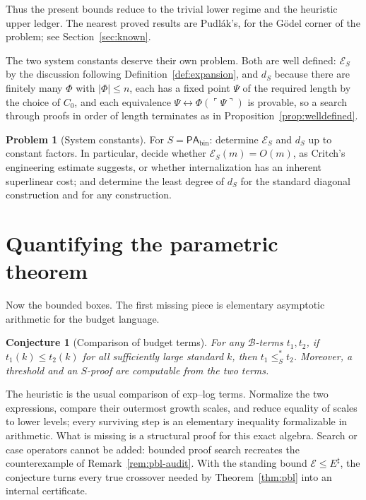 \documentclass[11pt]{amsart}
\theoremstyle{plain}
\newtheorem{conjecture}[theorem]{Conjecture}
\theoremstyle{definition}
\newtheorem{problem}[theorem]{Problem}
\newcommand{\PAbin}{\mathsf{PA}_{\mathrm{bin}}}
\newcommand{\gn}[1]{\ulcorner #1 \urcorner}
\newcommand{\Bud}{\mathcal{B}}
\newcommand{\leSstar}{\mathrel{\leq_S^{*}}}
\begin{document}
Thus the present bounds reduce to the trivial lower regime and the heuristic upper ledger. The nearest proved results are Pudl\'ak's, for the G\"odel corner of the problem; see Section~\ref{sec:known}.

The two system constants deserve their own problem. Both are well defined: $\mathcal{E}_S$ by the discussion following Definition~\ref{def:expansion}, and $d_S$ because there are finitely many $\Phi$ with $|\Phi| \le n$, each has a fixed point $\Psi$ of the required length by the choice of $C_0$, and each equivalence $\Psi \leftrightarrow \Phi(\gn{\Psi})$ is provable, so a search through proofs in order of length terminates as in Proposition~\ref{prop:welldefined}.

\begin{problem}[System constants]
\label{prob:expansion}
For $S = \PAbin$: determine $\mathcal{E}_S$ and $d_S$ up to constant factors. In particular, decide whether $\mathcal{E}_S(m) = O(m)$, as Critch's engineering estimate suggests, or whether internalization has an inherent superlinear cost; and determine the least degree of $d_S$ for the standard diagonal construction and for any construction.
\end{problem}

\section{Quantifying the parametric theorem}
\label{sec:parametric}

Now the bounded boxes. The first missing piece is elementary asymptotic arithmetic for the budget language.

\begin{conjecture}[Comparison of budget terms]
\label{conj:comparison}
For any $\Bud$-terms $t_1,t_2$, if $t_1(k)\le t_2(k)$ for all sufficiently large standard $k$, then $t_1\leSstar t_2$. Moreover, a threshold and an $S$-proof are computable from the two terms.
\end{conjecture}

The heuristic is the usual comparison of exp--log terms. Normalize the two expressions, compare their outermost growth scales, and reduce equality of scales to lower levels; every surviving step is an elementary inequality formalizable in arithmetic. What is missing is a structural proof for this exact algebra. Search or case operators cannot be added: bounded proof search recreates the counterexample of Remark~\ref{rem:pbl-audit}. With the standing bound $\mathcal E\le E^\sharp$, the conjecture turns every true crossover needed by Theorem~\ref{thm:pbl} into an internal certificate.
\end{document}
